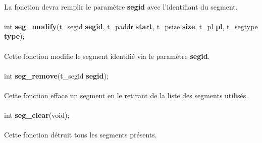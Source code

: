 \documentclass[10pt,a4wide]{article}
\begin{document}
\paragraph{}

La fonction devra remplir le param\`etre \textbf{segid} avec l'identifiant
du segment.

\paragraph{}

\hspace{1.5cm}int \textbf{seg\_modify}(t\_segid \textbf{segid},
                                       t\_paddr \textbf{start},
                                       t\_psize \textbf{size},
                                       t\_pl \textbf{pl},
                                       t\_segtype \textbf{type});

\paragraph{}

Cette fonction modifie le segment identifi\'e via le param\`etre
\textbf{segid}.

\paragraph{}

\hspace{1.5cm}int \textbf{seg\_remove}(t\_segid \textbf{segid});

\paragraph{}

Cette fonction efface un segment en le retirant de la liste des segments
utilis\'es.

\paragraph{}

\hspace{1.5cm}int \textbf{seg\_clear}(void);

\paragraph{}

Cette fonction d\'etruit tous les segments pr\'esents.
\end{document}
